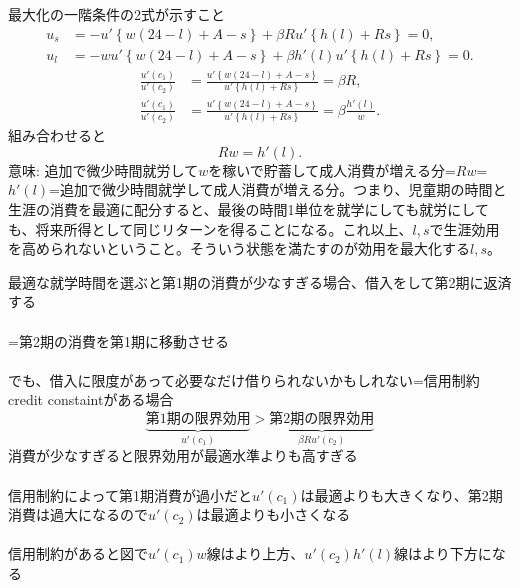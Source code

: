 

\begin{frame}{}
最大化の一階条件の2式が示すこと
\[
\begin{aligned}
u_{s}
&=-u'\left\{w(24-l)+A-s\right\}+\beta Ru'\left\{h(l)+Rs\right\}=0,\\
u_{l}
&=-wu'\left\{w(24-l)+A-s\right\}+\beta h'(l)u'\left\{h(l)+Rs\right\}=0.
\end{aligned}
\]
\[
\begin{aligned}
\frac{u'(c_{1})}{u'(c_{2})}&=\frac{u'\left\{w(24-l)+A-s\right\}}{u'\left\{h(l)+Rs\right\}}=\beta R,\\
\frac{u'(c_{1})}{u'(c_{2})}&=\frac{u'\left\{w(24-l)+A-s\right\}}{u'\left\{h(l)+Rs\right\}}=\beta \frac{h'(l)}{w}.
\end{aligned}
\]
組み合わせると
\[
Rw=h'(l).
\]
意味: 追加で微少時間就労して$w$を稼いで貯蓄して成人消費が増える分=$Rw$=$h'(l)$=追加で微少時間就学して成人消費が増える分。つまり、児童期の時間と生涯の消費を最適に配分すると、最後の時間1単位を就学にしても就労にしても、将来所得として同じリターンを得ることになる。これ以上、$l, s$で生涯効用を高められないということ。そういう状態を満たすのが効用を最大化する$l, s$。
\end{frame}

\begin{frame}{}
最適な就学時間を選ぶと第1期の消費が少なすぎる場合、借入をして第2期に返済する\\~\\
\pause
=第2期の消費を第1期に移動させる\\~\\
\pause
でも、借入に限度があって必要なだけ借りられないかもしれない=信用制約credit constaintがある場合
\pause
\[
\underbrace{\mbox{第1期の限界効用}}_{u'(c_{1})}>
\underbrace{\mbox{第2期の限界効用}}_{\beta Ru'(c_{2})}
\]
\pause
消費が少なすぎると限界効用が最適水準よりも高すぎる\\~\\
\pause
信用制約によって第1期消費が過小だと$u'(c_{1})$は最適よりも大きくなり、第2期消費は過大になるので$u'(c_{2})$は最適よりも小さくなる\\~\\
\pause
信用制約があると図で$u'(c_{1})w$線はより上方、$u'(c_{2})h'(l)$線はより下方になる
\end{frame}

